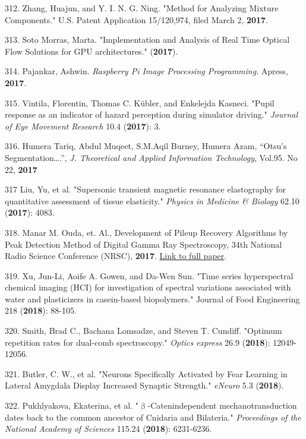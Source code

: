 312. Zhang, Huajun, and Y. I. N. G. Ning. "Method for Analyzing Mixture Components." U.S. Patent Application 15/120,974, filed March 2, \textbf{2017}.

313. Soto Morras, Marta. "Implementation and Analysis of Real Time Optical Flow Solutions for GPU architectures." (\textbf{2017}).

314. Pajankar, Ashwin. \textit{Raspberry Pi Image Processing Programming}. Apress, \textbf{2017}.

315. Vintila, Florentin, Thomas C. K\"{u}bler, and Enkelejda Kasneci. "Pupil response as an indicator of hazard perception during simulator driving." \textit{Journal of Eye Movement Research} 10.4 (\textbf{2017}): 3.

316. Humera Tariq, Abdul Muqeet, S.M.Aqil Burney, Humera Azam, ``Otsu’s Segmentation{\ldots}.'', \textit{J. Theoretical and Applied Information Technology}, Vol.95. No 22, \textbf{2017}

317 Liu, Yu, et al. "Supersonic transient magnetic resonance elastography for quantitative assessment of tissue elasticity." \textit{Physics in Medicine \& Biology} 62.10 (\textbf{2017}): 4083.

318. Manar M. Ouda, et. Al., Development of Pileup Recovery Algorithms by Peak Detection Method of Digital Gamma Ray Spectroscopy, 34th National Radio Science Conference (NRSC), \textbf{2017}. \href{https://www.researchgate.net/publication/315865878\_Development\_of\_pileup\_recovery\_algorithms\_by\_peak\_detection\_method\_of\_digital\_gamma\_ray\_spectroscopy}{Link to full paper}.

319. Xu, Jun-Li, Aoife A. Gowen, and Da-Wen Sun. "Time series hyperspectral chemical imaging (HCI) for investigation of spectral variations associated with water and plasticizers in casein-based biopolymers." Journal of Food Engineering 218 (\textbf{2018}): 88-105.

320. Smith, Brad C., Bachana Lomsadze, and Steven T. Cundiff. "Optimum repetition rates for dual-comb spectroscopy." \textit{Optics express} 26.9 (\textbf{2018}): 12049-12056.

321. Butler, C. W., et al. "Neurons Specifically Activated by Fear Learning in Lateral Amygdala Display Increased Synaptic Strength." \textit{eNeuro} 5.3 (\textbf{2018}).

322. Pukhlyakova, Ekaterina, et al. "${\upbeta}$-Catenin\textendash{}dependent mechanotransduction dates back to the common ancestor of Cnidaria and Bilateria." \textit{Proceedings of the National Academy of Sciences} 115.24 (\textbf{2018}): 6231-6236. 

